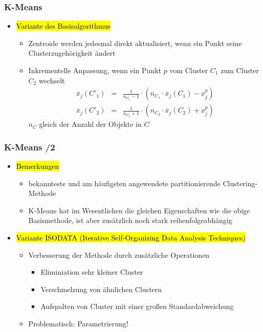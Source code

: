 
\begin{frame}
\frametitle{K-Means}

\begin{itemize}
\item \hl{Variante des Basisalgorithmus}
\begin{itemize}
\item Zentroide werden jedesmal direkt aktualisiert, wenn ein Punkt seine
Clusterzugehörigkeit ändert
\item Inkrementelle Anpassung, wenn ein Punkt $p$ vom Cluster $C_1$
  zum Cluster $C_2$ wechselt
\begin{eqnarray*}
\overline{x}_j(C'_1) &=& \frac{1}{n_{C_1}-1}\cdot (n_{C_1} \cdot
\overline{x}_j(C_1)-x^p_j) \\
\overline{x}_j(C'_2) &=& \frac{1}{n_{C_2}+1}\cdot
(n_{C_2} \cdot \overline{x}_j(C_2)+x^p_j)
\end{eqnarray*}
$n_C$ gleich der Anzahl der Objekte in $C$
\end{itemize}
\end{itemize}

\end{frame}


\begin{frame}
\frametitle{K-Means /2}

\begin{itemize}
\item \hl{Bemerkungen}
\begin{itemize}
\item bekannteste und am häufigsten angewendete partitionierende
  Clustering-Methode
\item K-Means hat im Wesentlichen die gleichen Eigenschaften wie die
  obige Basismethode, ist aber zusätzlich noch stark
  reihenfolgeabhängig
\end{itemize}
\item\hl{Variante ISODATA (Iterative Self-Organizing Data Analysis Techniques)}
\begin{itemize}
\item Verbesserung der Methode durch zusätzliche Operationen
\begin{itemize}
\item Eliminiation sehr kleiner Cluster
\item Verschmelzung von ähnlichen Clustern
\item Aufspalten von Cluster mit einer großen Standardabweichung
\end{itemize}
\item Problematisch: Parametrierung!
\end{itemize}
\end{itemize}

\end{frame}


